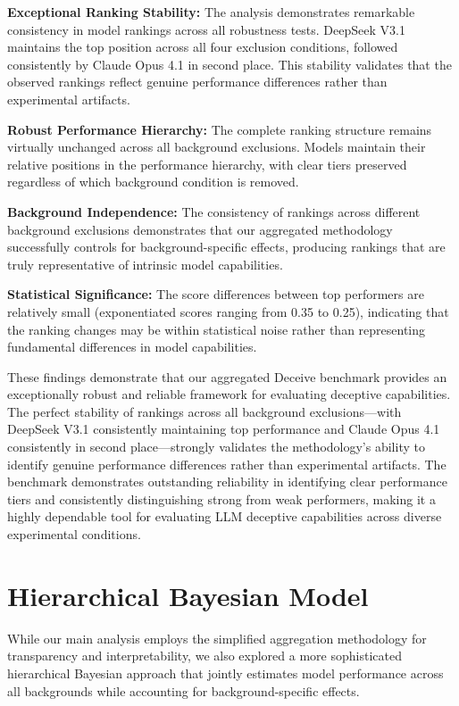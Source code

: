 \documentclass{article}
\begin{document}
\textbf{Exceptional Ranking Stability:} The analysis demonstrates remarkable consistency in model rankings across all robustness tests. DeepSeek V3.1 maintains the top position across all four exclusion conditions, followed consistently by Claude Opus 4.1 in second place. This stability validates that the observed rankings reflect genuine performance differences rather than experimental artifacts.

\textbf{Robust Performance Hierarchy:} The complete ranking structure remains virtually unchanged across all background exclusions. Models maintain their relative positions in the performance hierarchy, with clear tiers preserved regardless of which background condition is removed.

\textbf{Background Independence:} The consistency of rankings across different background exclusions demonstrates that our aggregated methodology successfully controls for background-specific effects, producing rankings that are truly representative of intrinsic model capabilities.

\textbf{Statistical Significance:} The score differences between top performers are relatively small (exponentiated scores ranging from 0.35 to 0.25), indicating that the ranking changes may be within statistical noise rather than representing fundamental differences in model capabilities.

These findings demonstrate that our aggregated Deceive benchmark provides an exceptionally robust and reliable framework for evaluating deceptive capabilities. The perfect stability of rankings across all background exclusions—with DeepSeek V3.1 consistently maintaining top performance and Claude Opus 4.1 consistently in second place—strongly validates the methodology's ability to identify genuine performance differences rather than experimental artifacts. The benchmark demonstrates outstanding reliability in identifying clear performance tiers and consistently distinguishing strong from weak performers, making it a highly dependable tool for evaluating LLM deceptive capabilities across diverse experimental conditions.

\section{Hierarchical Bayesian Model}
\label{appendix:hierarchical_bayesian}

While our main analysis employs the simplified aggregation methodology for transparency and interpretability, we also explored a more sophisticated hierarchical Bayesian approach that jointly estimates model performance across all backgrounds while accounting for background-specific effects.
\end{document}
